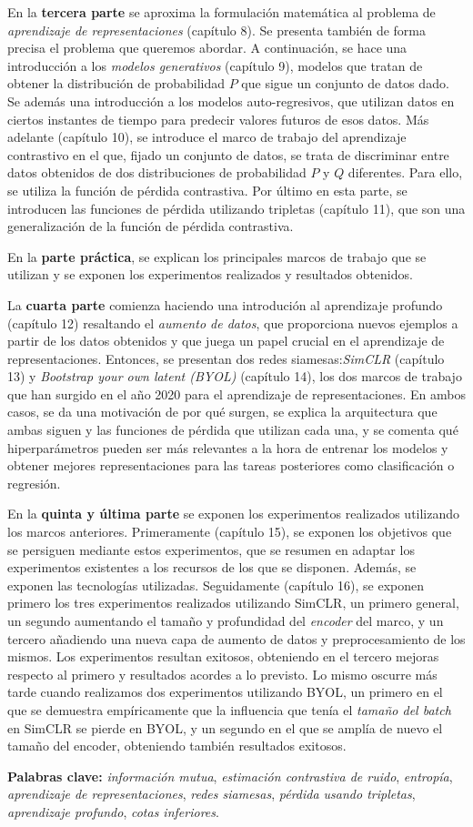 En la \textbf{tercera parte} se aproxima la formulación matemática al problema de \emph{aprendizaje de representaciones} (capítulo 8). Se presenta también de forma precisa el problema que queremos abordar. A continuación, se hace una introducción a los \emph{modelos generativos} (capítulo 9), modelos que tratan de obtener la distribución de probabilidad $P$ que sigue un conjunto de datos dado. Se además una introducción a los modelos auto-regresivos, que utilizan datos en ciertos instantes de tiempo para predecir valores futuros de esos datos. Más adelante (capítulo 10), se introduce el marco de trabajo del aprendizaje contrastivo en el que, fijado un conjunto de datos, se trata de discriminar entre datos obtenidos de dos distribuciones de probabilidad $P$ y $Q$ diferentes. Para ello, se utiliza la función de pérdida contrastiva. Por último en esta parte, se introducen las funciones de pérdida utilizando tripletas (capítulo 11), que son una generalización de la función de pérdida contrastiva.

En la \textbf{parte práctica}, se explican los principales marcos de trabajo que se utilizan y se exponen los experimentos realizados y resultados obtenidos.

La \textbf{cuarta parte} comienza haciendo una introdución al aprendizaje profundo (capítulo 12) resaltando el \emph{aumento de datos}, que proporciona nuevos ejemplos a partir de los datos obtenidos y que juega un papel crucial en el aprendizaje de representaciones. Entonces, se presentan dos redes siamesas:\emph{SimCLR} (capítulo 13) y \emph{Bootstrap your own latent (BYOL)} (capítulo 14), los dos marcos de trabajo que han surgido en el año 2020 para el aprendizaje de representaciones. En ambos casos, se da una motivación de por qué surgen, se explica la arquitectura que ambas siguen y las funciones de pérdida que utilizan cada una, y se comenta qué hiperparámetros pueden ser más relevantes a la hora de entrenar los modelos y obtener mejores representaciones para las tareas posteriores como clasificación o regresión.

En la \textbf{quinta y última parte} se exponen los experimentos realizados utilizando los marcos anteriores. Primeramente (capítulo 15), se exponen los objetivos que se persiguen mediante estos experimentos, que se resumen en adaptar los experimentos existentes a los recursos de los que se disponen. Además, se exponen las tecnologías utilizadas. Seguidamente (capítulo 16), se exponen primero los tres experimentos realizados utilizando SimCLR, un primero general, un segundo aumentando el tamaño y profundidad del \emph{encoder} del marco, y un tercero añadiendo una nueva capa de aumento de datos y preprocesamiento de los mismos. Los experimentos resultan exitosos, obteniendo en el tercero mejoras respecto al primero y resultados acordes a lo previsto. Lo mismo oscurre más tarde cuando realizamos dos experimentos utilizando BYOL, un primero en el que se demuestra empíricamente que la influencia que tenía el \emph{tamaño del batch} en SimCLR se pierde en BYOL, y un segundo en el que se amplía de nuevo el tamaño del encoder, obteniendo también resultados exitosos.

\textbf{Palabras clave:} \emph{información mutua}, \emph{estimación contrastiva de ruido}, \emph{entropía}, \emph{aprendizaje de representaciones}, \emph{redes siamesas}, \emph{pérdida usando tripletas}, \emph{aprendizaje profundo}, \emph{cotas inferiores}.
